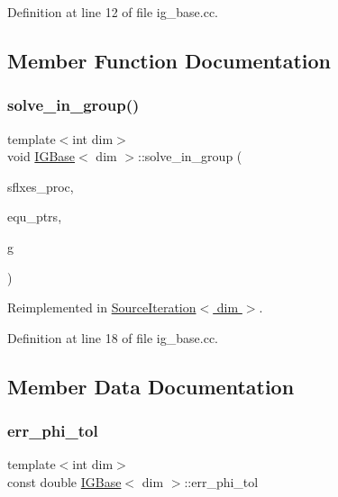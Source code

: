 Definition at line 12 of file ig\+\_\+base.\+cc.



\subsection{Member Function Documentation}
\mbox{\label{class_i_g_base_abd1edeb3ca2076fcb087abc658a09f30}} 
\subsubsection{\texorpdfstring{solve\+\_\+in\+\_\+group()}{solve\_in\_group()}}
{\footnotesize\ttfamily template$<$int dim$>$ \\
void \hyperlink{class_i_g_base}{I\+G\+Base}$<$ dim $>$\+::solve\+\_\+in\+\_\+group (\begin{DoxyParamCaption}\item[{std\+::vector$<$ Vector$<$ double $>$ $>$ \&}]{sflxes\+\_\+proc,  }\item[{std\+\_\+cxx11\+::shared\+\_\+ptr$<$ \hyperlink{class_equation_base}{Equation\+Base}$<$ dim $>$ $>$}]{equ\+\_\+ptrs,  }\item[{unsigned int \&}]{g }\end{DoxyParamCaption})\hspace{0.3cm}{\ttfamily [virtual]}}



Reimplemented in \hyperlink{class_source_iteration_a6d726b9a581391cc4164c29f4ccd1ca5}{Source\+Iteration$<$ dim $>$}.



Definition at line 18 of file ig\+\_\+base.\+cc.



\subsection{Member Data Documentation}
\mbox{\label{class_i_g_base_ace9461aa2cfc9dcc4455616d2d9d6049}} 
\subsubsection{\texorpdfstring{err\+\_\+phi\+\_\+tol}{err\_phi\_tol}}
{\footnotesize\ttfamily template$<$int dim$>$ \\
const double \hyperlink{class_i_g_base}{I\+G\+Base}$<$ dim $>$\+::err\+\_\+phi\+\_\+tol\hspace{0.3cm}{\ttfamily [protected]}}




